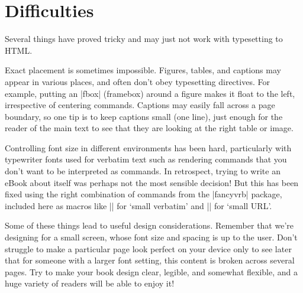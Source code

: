 \section{Difficulties}

Several things have proved tricky and may just not work with typesetting to HTML.

Exact placement is sometimes impossible. Figures, tables, and captions may appear
in various places, and often don't obey \tex typesetting directives. For example,
putting an \sverb|fbox| (framebox) around a figure makes it float to the left, irrespective of
centering commands. Captions may easily fall across
a page boundary, so one tip is to keep captions small (one line), just enough for the reader
of the main text to see that they are looking at the right table or image.

Controlling font size in different environments has been hard, particularly with typewriter fonts
used for verbatim text such as rendering \latex commands that you don't want to be interpreted as
\latex commands. In retrospect, trying to write an eBook about \latex itself was perhaps not the
most sensible decision! But this has been fixed using the right combination of commands from the
\sverb|fancyvrb| package, included here as macros like \sverb|\sverb| for `small verbatim' and
\sverb|\surl| for `small URL'.

Some of these things lead to useful design considerations.
Remember that we're designing for a small screen, whose font size and spacing is up to the user. 
Don't struggle to make a particular page look perfect on your device
only to see later that for someone with a larger font setting, this content is broken across
several pages. Try to make your book design clear, legible,
and somewhat flexible, and a huge variety of readers will be able to enjoy it!

